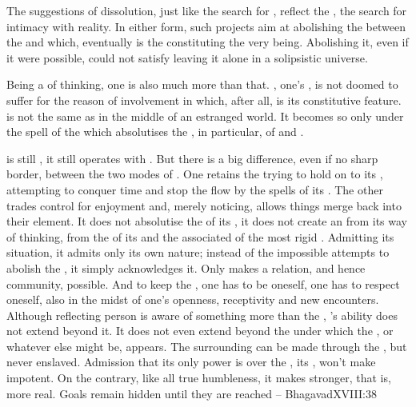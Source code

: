 The suggestions of dissolution, just like the search for ,
reflect the , the search for intimacy with reality.  In either form,
such  projects aim at abolishing the  between the
 and  which, eventually is the 
constituting the very  being. Abolishing it, even if it were
possible, could not satisfy  leaving it alone in a solipsistic
universe. 


\pa Being a  of  thinking, one is also much more than
that.  , one's , is not doomed to suffer for the
reason of involvement in  which, after all, is its
constitutive feature.  is not the same as
 in the middle of an estranged world. It becomes so only under
the spell of the  which absolutises the , in particular, of  and .

 is still , it still operates with
 . But there is a big difference, even if no sharp
border, between the two
modes of . One retains the  trying to hold on to its
, attempting to conquer time and stop the flow by the spells of its
. The other trades control for enjoyment and, merely
noticing, allows things merge back into their element.  It does not absolutise
the  of its , it does not create an  from its way of
thinking, from the  of its  and the associated
 of the most rigid .  Admitting its situation, it
admits only its own nature; instead of the impossible attempts to abolish the
, it simply acknowledges it. Only  makes a relation,
and hence community, possible. And to keep the , one has to be
oneself, one has to respect oneself, also in the midst of one's openness,
receptivity and new encounters.  Although reflecting person is aware of
something more than the  , 's ability does
not extend beyond it. It does not even extend beyond the  under which
the , or whatever else might be, appears.  The surrounding
 can be made  through the , but never
enslaved.  Admission that its only power is over the , its , won't make  impotent.
On the contrary, like all true humbleness, it makes stronger, that is, more
real. Goals remain hidden until they are reached -- \citet{What seems at
  first a cup of sorrow is found in the end immortal wine.}{Bhagavad}{XVIII:38}

